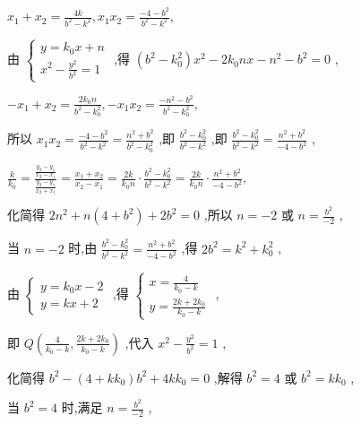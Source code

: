 \documentclass[10pt]{article}
\begin{document}
\({x}_{1} + {x}_{2} = \frac{4k}{{b}^{2} - {k}^{2}},{x}_{1}{x}_{2} = \frac{-4 - {b}^{2}}{{b}^{2} - {k}^{2}},\)

由 \(\left\{  \begin{array}{l} y = {k}_{0}x + n \\  {x}^{2} - \frac{{y}^{2}}{{b}^{2}} = 1 \end{array}\right.\) ,得 \(\left( {{b}^{2} - {k}_{0}^{2}}\right) {x}^{2} - 2{k}_{0}{nx} - {n}^{2} - {b}^{2} = 0\) ,

\(- {x}_{1} + {x}_{2} = \frac{2{k}_{0}n}{{b}^{2} - {k}_{0}^{2}}, - {x}_{1}{x}_{2} = \frac{-{n}^{2} - {b}^{2}}{{b}^{2} - {k}_{0}^{2}},\)

所以 \({x}_{1}{x}_{2} = \frac{-4 - {b}^{2}}{{b}^{2} - {k}^{2}} = \frac{{n}^{2} + {b}^{2}}{{b}^{2} - {k}_{0}^{2}}\) ,即 \(\frac{{b}^{2} - {k}_{0}^{2}}{{b}^{2} - {k}^{2}}\) ,即 \(\frac{{b}^{2} - {k}_{0}^{2}}{{b}^{2} - {k}^{2}} = \frac{{n}^{2} + {b}^{2}}{-4 - {b}^{2}}\) ,

\(\frac{k}{{k}_{0}} = \frac{\frac{{y}_{2} - {y}_{1}}{{x}_{2} - {x}_{1}}}{\frac{{y}_{2} - {y}_{1}}{{x}_{2} + {x}_{1}}} = \frac{{x}_{1} + {x}_{2}}{{x}_{2} - {x}_{1}} = \frac{2k}{{k}_{0}n} \cdot  \frac{{b}^{2} - {k}_{0}^{2}}{{b}^{2} - {k}^{2}} = \frac{2k}{{k}_{0}n} \cdot  \frac{{n}^{2} + {b}^{2}}{-4 - {b}^{2}},\)

化简得 \(2{n}^{2} + n\left( {4 + {b}^{2}}\right)  + 2{b}^{2} = 0\) ,所以 \(n =  - 2\) 或 \(n = \frac{{b}^{2}}{-2}\) ,

当 \(n =  - 2\) 时,由 \(\frac{{b}^{2} - {k}_{0}^{2}}{{b}^{2} - {k}^{2}} = \frac{{n}^{2} + {b}^{2}}{-4 - {b}^{2}}\) ,得 \(2{b}^{2} = {k}^{2} + {k}_{0}^{2}\) ,

由 \(\left\{  \begin{array}{l} y = {k}_{0}x - 2 \\  y = {kx} + 2 \end{array}\right.\) ,得 \(\left\{  \begin{array}{l} x = \frac{4}{{k}_{0} - k} \\  y = \frac{{2k} + 2{k}_{0}}{{k}_{0} - k} \end{array}\right.\) ,

即 \(Q\left( {\frac{4}{{k}_{0} - k},\frac{{2k} + 2{k}_{0}}{{k}_{0} - k}}\right)\) ,代入 \({x}^{2} - \frac{{y}^{2}}{{b}^{2}} = 1\) ,

化简得 \({b}^{2} - \left( {4 + k{k}_{0}}\right) {b}^{2} + {4k}{k}_{0} = 0\) ,解得 \({b}^{2} = 4\) 或 \({b}^{2} = k{k}_{0}\) ,

当 \({b}^{2} = 4\) 时,满足 \(n = \frac{{b}^{2}}{-2}\) ,
\end{document}
